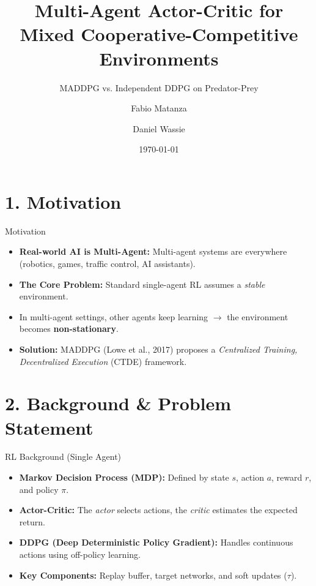 \documentclass[aspectratio=169]{beamer}
\title{Multi-Agent Actor-Critic for Mixed Cooperative-Competitive Environments}
\subtitle{MADDPG vs. Independent DDPG on Predator-Prey}
\author{Fabio Matanza \and Daniel Wassie}
\institute{Advanced Reinforcement Learning and Agentic AI Systems}
\date{\today}
\begin{document}
\maketitle

\section{1. Motivation}

\begin{frame}{Motivation}
    \begin{itemize}
        \item \textbf{Real-world AI is Multi-Agent:} Multi-agent systems are everywhere (robotics, games, traffic control, AI assistants).
        \item \textbf{The Core Problem:} Standard single-agent RL assumes a \textit{stable} environment.
        \item In multi-agent settings, other agents keep learning $\rightarrow$ the environment becomes \textbf{non-stationary}.
        \item \textbf{Solution:} MADDPG (Lowe et al., 2017) proposes a \textit{Centralized Training, Decentralized Execution} (CTDE) framework.
    \end{itemize}
\end{frame}

\section{2. Background \& Problem Statement}

\begin{frame}{RL Background (Single Agent)}
    \begin{itemize}
        \item \textbf{Markov Decision Process (MDP):} Defined by state $s$, action $a$, reward $r$, and policy $\pi$.
        \item \textbf{Actor-Critic:} The \textit{actor} selects actions, the \textit{critic} estimates the expected return.
        \item \textbf{DDPG (Deep Deterministic Policy Gradient):} Handles continuous actions using off-policy learning.
        \item \textbf{Key Components:} Replay buffer, target networks, and soft updates ($\tau$).
    \end{itemize}
\end{frame}
\end{document}
